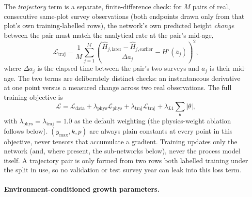 \documentclass[11pt,a4paper]{report}
\begin{document}
The \emph{trajectory} term is a separate, finite-difference check: for $M$ pairs of real,
consecutive same-plot survey observations (both endpoints drawn only from that plot's own
training-labelled rows), the network's own predicted height \emph{change} between the pair must
match the analytical rate at the pair's mid-age,
\begin{equation}
\mathcal{L}_{\text{traj}} = \frac{1}{M}\sum_{j=1}^{M}\left(\frac{\hat H_{j,\text{later}} -
\hat H_{j,\text{earlier}}}{\Delta a_j} - H'(\bar a_j)\right)^2,
\label{eq:trajectory-loss}
\end{equation}
where $\Delta a_j$ is the elapsed time between the pair's two surveys and $\bar a_j$ is their
mid-age. The two terms are deliberately distinct checks: an instantaneous derivative at one point
versus a measured change across two real observations. The full training objective is
\begin{equation}
\mathcal{L} = \mathcal{L}_{\text{data}} + \lambda_{\text{phys}}\mathcal{L}_{\text{phys}} +
\lambda_{\text{traj}}\mathcal{L}_{\text{traj}} + \lambda_{L1}\sum_{\theta}|\theta|,
\label{eq:total-loss}
\end{equation}
with $\lambda_{\text{phys}}=\lambda_{\text{traj}}=1.0$ as the default weighting (the physics-weight
ablation follows below). $(y_{\max},k,p)$ are always plain
constants at every point in this objective, never tensors that accumulate a gradient. Training
updates only the network (and, where present, the sub-networks below), never the process model
itself. A trajectory pair is only formed from two rows both labelled training under the split in
use, so no validation or test survey year can leak into this loss term.

\paragraph*{Environment-conditioned growth parameters.}
\end{document}
